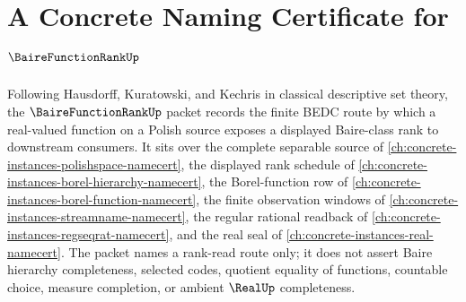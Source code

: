 \chapter{A Concrete Naming Certificate for $\BaireFunctionRankUp$}
\label{ch:concrete-instances-baire-function-rank-namecert}

Following Hausdorff, Kuratowski, and Kechris in classical descriptive set theory, the $\BaireFunctionRankUp$ packet records the finite BEDC route by which a real-valued function on a Polish source exposes a displayed Baire-class rank to downstream consumers. It sits over the complete separable source of \autoref{ch:concrete-instances-polishspace-namecert}, the displayed rank schedule of \autoref{ch:concrete-instances-borel-hierarchy-namecert}, the Borel-function row of \autoref{ch:concrete-instances-borel-function-namecert}, the finite observation windows of \autoref{ch:concrete-instances-streamname-namecert}, the regular rational readback of \autoref{ch:concrete-instances-regseqrat-namecert}, and the real seal of \autoref{ch:concrete-instances-real-namecert}. The packet names a rank-read route only; it does not assert Baire hierarchy completeness, selected codes, quotient equality of functions, countable choice, measure completion, or ambient $\RealUp$ completeness.

